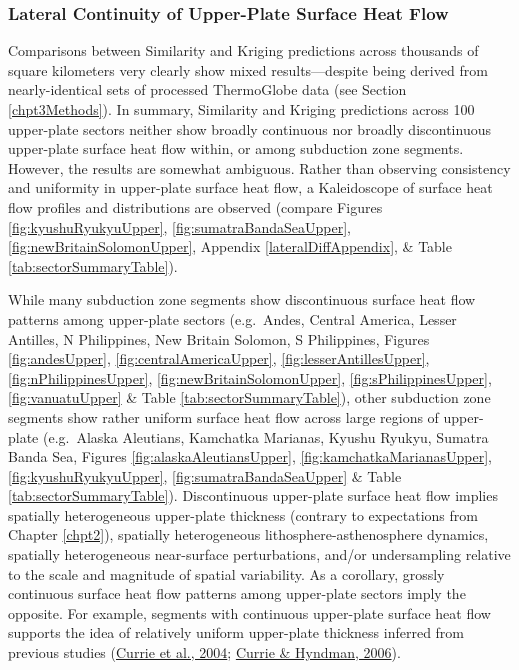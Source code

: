 \hypertarget{lateral-continuity-of-upper-plate-surface-heat-flow}{%
\subsubsection{Lateral Continuity of Upper-Plate Surface Heat Flow}\label{lateral-continuity-of-upper-plate-surface-heat-flow}}

Comparisons between Similarity and Kriging predictions across thousands of square kilometers very clearly show mixed results---despite being derived from nearly-identical sets of processed ThermoGlobe data (see Section \ref{chpt3Methods}). In summary, Similarity and Kriging predictions across 100 upper-plate sectors neither show broadly continuous nor broadly discontinuous upper-plate surface heat flow within, or among subduction zone segments. However, the results are somewhat ambiguous. Rather than observing consistency and uniformity in upper-plate surface heat flow, a Kaleidoscope of surface heat flow profiles and distributions are observed (compare Figures \ref{fig:kyushuRyukyuUpper}, \ref{fig:sumatraBandaSeaUpper}, \ref{fig:newBritainSolomonUpper}, Appendix \ref{lateralDiffAppendix}, \& Table \ref{tab:sectorSummaryTable}).

While many subduction zone segments show discontinuous surface heat flow patterns among upper-plate sectors (e.g.~Andes, Central America, Lesser Antilles, N Philippines, New Britain Solomon, S Philippines, Figures \ref{fig:andesUpper}, \ref{fig:centralAmericaUpper}, \ref{fig:lesserAntillesUpper}, \ref{fig:nPhilippinesUpper}, \ref{fig:newBritainSolomonUpper}, \ref{fig:sPhilippinesUpper}, \ref{fig:vanuatuUpper} \& Table \ref{tab:sectorSummaryTable}), other subduction zone segments show rather uniform surface heat flow across large regions of upper-plate (e.g.~Alaska Aleutians, Kamchatka Marianas, Kyushu Ryukyu, Sumatra Banda Sea, Figures \ref{fig:alaskaAleutiansUpper}, \ref{fig:kamchatkaMarianasUpper}, \ref{fig:kyushuRyukyuUpper}, \ref{fig:sumatraBandaSeaUpper} \& Table \ref{tab:sectorSummaryTable}). Discontinuous upper-plate surface heat flow implies spatially heterogeneous upper-plate thickness (contrary to expectations from Chapter \ref{chpt2}), spatially heterogeneous lithosphere-asthenosphere dynamics, spatially heterogeneous near-surface perturbations, and/or undersampling relative to the scale and magnitude of spatial variability. As a corollary, grossly continuous surface heat flow patterns among upper-plate sectors imply the opposite. For example, segments with continuous upper-plate surface heat flow supports the idea of relatively uniform upper-plate thickness inferred from previous studies (\protect\hyperlink{ref-currie2004}{Currie et al., 2004}; \protect\hyperlink{ref-currie2006}{Currie \& Hyndman, 2006}).

